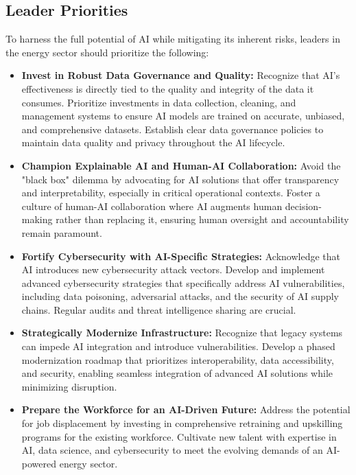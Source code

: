 \subsection{Leader Priorities}
To harness the full potential of AI while mitigating its inherent risks, leaders in the energy sector should prioritize the following:
\begin{itemize}
    \item \textbf{Invest in Robust Data Governance and Quality:} Recognize that AI's effectiveness is directly tied to the quality and integrity of the data it consumes. Prioritize investments in data collection, cleaning, and management systems to ensure AI models are trained on accurate, unbiased, and comprehensive datasets. Establish clear data governance policies to maintain data quality and privacy throughout the AI lifecycle.
    \item \textbf{Champion Explainable AI and Human-AI Collaboration:} Avoid the "black box" dilemma by advocating for AI solutions that offer transparency and interpretability, especially in critical operational contexts. Foster a culture of human-AI collaboration where AI augments human decision-making rather than replacing it, ensuring human oversight and accountability remain paramount.
    \item \textbf{Fortify Cybersecurity with AI-Specific Strategies:} Acknowledge that AI introduces new cybersecurity attack vectors. Develop and implement advanced cybersecurity strategies that specifically address AI vulnerabilities, including data poisoning, adversarial attacks, and the security of AI supply chains. Regular audits and threat intelligence sharing are crucial.
    \item \textbf{Strategically Modernize Infrastructure:} Recognize that legacy systems can impede AI integration and introduce vulnerabilities. Develop a phased modernization roadmap that prioritizes interoperability, data accessibility, and security, enabling seamless integration of advanced AI solutions while minimizing disruption.
    \item \textbf{Prepare the Workforce for an AI-Driven Future:} Address the potential for job displacement by investing in comprehensive retraining and upskilling programs for the existing workforce. Cultivate new talent with expertise in AI, data science, and cybersecurity to meet the evolving demands of an AI-powered energy sector.
\end{itemize}

